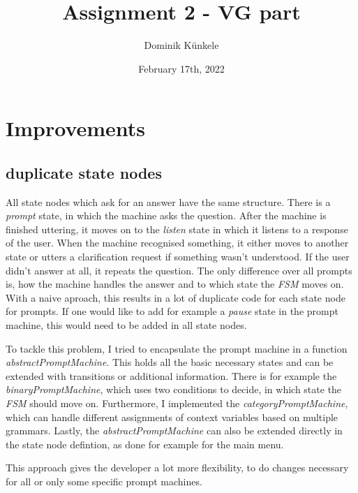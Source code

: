 \documentclass[
	11pt, %
]{fphw}
\title{Assignment 2 - VG part} %
\date{February 17th, 2022} %
\author{Dominik Künkele}
\institute{University of Gothenburg} %
\begin{document}
\maketitle %


\section*{Improvements}

\subsection*{duplicate state nodes}
All state nodes which ask for an answer have the same structure. There is a \emph{prompt} state, in which
the machine asks the question. After the machine is finished uttering, it moves on to the \emph{listen} state
in which it listens to a response of the user. When the machine recognised something, it either moves
to another state or utters a clarification request if something wasn't understood. If the user didn't 
answer at all, it repeats the question. The only difference over all prompts is, how the machine 
handles the answer and to which state the \emph{FSM} moves on. With a naive aproach, this results 
in a lot of duplicate code for each state node for prompts. If one would like to add for example 
a \emph{pause} state in the prompt machine, this would need to be added in all state nodes.

To tackle this problem, I tried to encapsulate the prompt machine in a function 
\emph{abstractPromptMachine}. This holds all the basic necessary states and can be extended 
with transitions or additional information. There is for example the \emph{binaryPromptMachine}, 
which uses two conditions to decide, in which state the \emph{FSM} should move on. Furthermore, 
I implemented the \emph{categoryPromptMachine}, which can handle different assignments of context 
variables based on multiple grammars. Lastly, the \emph{abstractPromptMachine} can also be extended
directly in the state node defintion, as done for example for the main menu.

This approach gives the developer a lot more flexibility, to do changes necessary for all or 
only some specific prompt machines.
\end{document}
